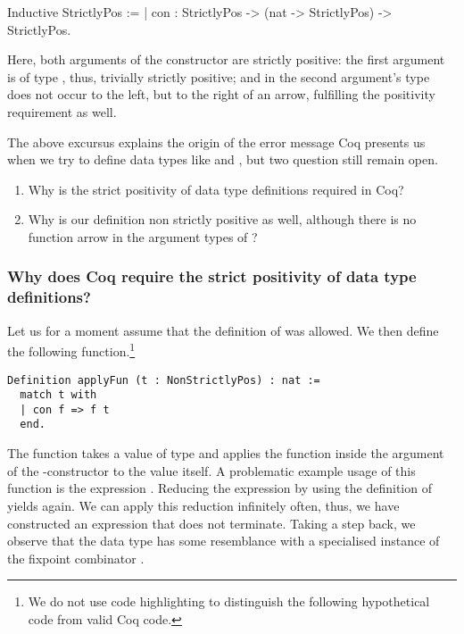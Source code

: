 \begin{coqcode}
Inductive StrictlyPos :=
| con : StrictlyPos -> (nat -> StrictlyPos) -> StrictlyPos.
\end{coqcode}

Here, both arguments of the constructor  are strictly positive: the first argument is of type , thus, trivially strictly positive; and in the second argument's type  does not occur to the left, but to the right of an arrow, fulfilling the positivity requirement as well.

The above excursus explains the origin of the error message Coq presents us when we try to define data types like  and , but two question still remain open.

\begin{enumerate}
\item Why is the strict positivity of data type definitions required in Coq?
\item Why is our definition  non strictly positive as well, although there is no function arrow in the argument types of ?
\end{enumerate}

\subsubsection{Why does Coq require the strict positivity of data type definitions?}

Let us for a moment assume that the definition of  was allowed.
We then define the following function.\footnote{We do not use code highlighting to distinguish the following hypothetical code from valid Coq code.}

\begin{verbatim}
Definition applyFun (t : NonStrictlyPos) : nat :=
  match t with
  | con f => f t
  end.
\end{verbatim}

The function  takes a value  of type  and applies the function  inside the
argument of the \--constructor to the value  itself.
A problematic example usage of this function is the expression .
Reducing the expression by using the definition of  yields  again.
We can apply this reduction infinitely often, thus, we have constructed an expression that does not terminate.
Taking a step back, we observe that the data type  has some resemblance with a specialised instance
of the fixpoint combinator .

